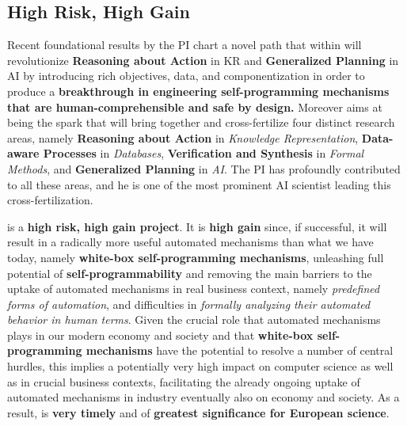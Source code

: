 



\subsection{High Risk, High Gain}

Recent foundational results by the PI chart a novel path that within \project will revolutionize \textbf{Reasoning about Action}  in KR and \textbf{Generalized Planning} in AI by introducing rich objectives, data, and componentization in order to produce a \textbf{breakthrough in engineering self-programming mechanisms that are human-comprehensible and safe by design.}
Moreover \project aims at being the spark that will bring together and
cross-fertilize four distinct research areas, namely \textbf{Reasoning
  about Action} in \emph{Knowledge Representation}, \textbf{Data-aware
  Processes} in \emph{Databases}, \textbf{Verification and Synthesis}
in \emph{Formal Methods}, and \textbf{Generalized Planning} in
\emph{AI}.
The PI has profoundly contributed to all these areas, and he is %
one of the most prominent AI scientist leading this cross-fertilization.




\project is a \textbf{high risk, high gain project}.
It is \textbf{high gain} since, if successful, it
will result in a radically more useful automated mechanisms than what
we have today, namely \textbf{white-box self-programming mechanisms},
unleashing full potential of \textbf{self-programmability} and
removing the main barriers to the uptake of automated mechanisms in
real business context, namely \textit{predefined forms of automation}, and
difficulties in \textit{formally analyzing their automated behavior in human terms}.
%
Given the crucial role that automated mechanisms plays in our modern economy and society and that \textbf{white-box self-programming mechanisms} have the potential to resolve a number of central hurdles, %
this implies a potentially very high impact on computer science as well as in crucial  business contexts, facilitating the already ongoing uptake of automated mechanisms in industry eventually also on economy and society. 
%
As a result, \project is \textbf{very timely} and of \textbf{greatest significance for European science}.




